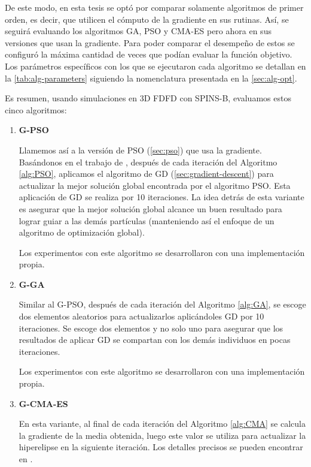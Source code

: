 De este modo, en esta tesis se optó por comparar solamente algoritmos de primer orden, es decir, que utilicen
el cómputo de la gradiente en sus rutinas. Así, se seguirá evaluando los algoritmos GA, PSO y CMA-ES pero
ahora en sus versiones que usan la gradiente.
Para poder comparar el desempeño de estos se configuró la máxima cantidad de veces que podían
evaluar la función objetivo. 
Los parámetros específicos con los que se ejecutaron cada algoritmo se detallan en la
\autoref{tab:alg-parameters} siguiendo la nomenclatura presentada en la \autoref{sec:alg-opt}.

Es resumen, usando simulaciones en 3D FDFD con SPINS-B, evaluamos estos cinco algoritmos:

\begin{enumerate}
  \item \textbf{G-PSO}

  Llamemos así a la versión de PSO (\autoref{sec:pso}) que usa la gradiente. 
  Basándonos en el trabajo de \cite{Demidova2020}, después de cada iteración
  del Algoritmo \ref{alg:PSO}, aplicamos el algoritmo de GD
  (\autoref{sec:gradient-descent}) para actualizar la mejor solución global encontrada por el 
  algoritmo PSO. Esta aplicación de GD se realiza por 10 iteraciones.
  La idea detrás de esta variante es asegurar que la mejor solución global alcance un buen resultado
  para lograr guiar a las demás partículas (manteniendo así el enfoque de un algoritmo de optimización
  global).
  
  Los experimentos con este algoritmo se desarrollaron con una implementación propia.

  \item \textbf{G-GA}

  Similar al G-PSO, después de cada iteración del Algoritmo \ref{alg:GA}, se escoge dos
  elementos aleatorios para actualizarlos aplicándoles GD por 10 iteraciones.
  Se escoge dos elementos y no solo uno para asegurar que los resultados de aplicar GD
  se compartan con los demás individuos en pocas iteraciones.

  Los experimentos con este algoritmo se desarrollaron con una implementación propia.

  \item \textbf{G-CMA-ES}

  En esta variante, al final de cada iteración del Algoritmo \ref{alg:CMA} se
  calcula la gradiente de la media obtenida, luego este valor se utiliza para
  actualizar la hiperelipse en la siguiente iteración.
  Los detalles precisos se pueden encontrar en \cite{Nikolaus2021}.


\end{enumerate}

